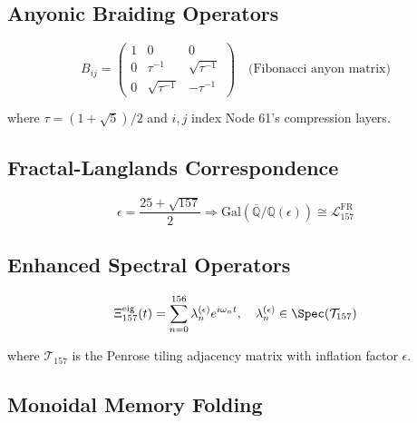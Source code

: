 \documentclass[12pt]{article}
\begin{document}
\begin{center}
\subsection*{Anyonic Braiding Operators}

\begin{equation}
\label{eq:braid}
B_{ij} = \begin{pmatrix}
1 & 0 & 0 \\
0 & \tau^{-1} & \sqrt{\tau^{-1}} \\
0 & \sqrt{\tau^{-1}} & -\tau^{-1}
\end{pmatrix} \quad \text{(Fibonacci anyon matrix)}
\end{equation}

where $\tau = (1+\sqrt{5})/2$ and $i,j$ index Node 61's compression layers.

\subsection*{Fractal-Langlands Correspondence}

\begin{equation}
\label{eq:langlands}
\epsilon = \frac{25 + \sqrt{157}}{2} \Rightarrow \text{Gal}(\overline{\mathbb{Q}}/\mathbb{Q}(\epsilon)) \cong \mathscr{L}_{157}^{\text{FR}}
\end{equation}


\subsection*{Enhanced Spectral Operators}

\begin{equation}
\label{eq:spectral}
\Xi_{157}^{\text{eig}}(t) = \sum_{n=0}^{156} \lambda_n^{(\epsilon)} e^{i\omega_n t}, \quad \lambda_n^{(\epsilon)} \in \Spec(\mathcal{T}_{157})
\end{equation}

where $\mathcal{T}_{157}$ is the Penrose tiling adjacency matrix with inflation factor $\epsilon$.

\subsection*{Monoidal Memory Folding}


\end{center}
\end{document}
